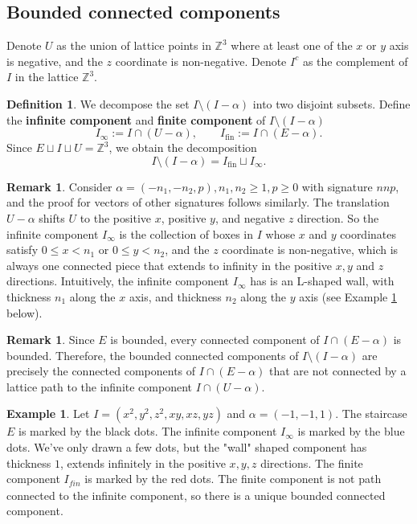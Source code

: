 \documentclass{amsart}[10pt]
\theoremstyle{plain}
\theoremstyle{definition}
\newtheorem{example}[theorem]{Example}
\newtheorem{remark}[theorem]{Remark}
\newtheorem{definition}[theorem]{Definition}
\begin{document}
\subsection{Bounded connected components}

Denote $U$ as the union of lattice points in $\mathbb{Z}^3$ where at least one of the $x$ or $y$ axis is negative, and the $z$ coordinate is non-negative. Denote $I^c$ as the complement of $I$ in the lattice $\mathbb{Z}^3$.

\begin{definition}
We decompose the set $I \setminus (I-\alpha)$ into two disjoint subsets. Define the \textbf{infinite component} and \textbf{finite component} of $I \setminus (I - \alpha)$
$$
I_{\infty}:=I\cap(U-\alpha),\qquad
I_{\mathrm{fin}}:=I\cap(E-\alpha).
$$
Since $E \sqcup I \sqcup U=\mathbb{Z}^3$, we obtain the decomposition
$$
I\setminus(I-\alpha)=I_{\mathrm{fin}}\sqcup I_{\infty}.
$$
\end{definition}


\begin{remark}
Consider $\alpha=(-n_1, -n_2, p), n_1, n_2 \geq 1, p \geq 0$ with signature $nnp$, and the proof for vectors of other signatures follows similarly. The translation $U-\alpha$ shifts $U$ to the positive $x$, positive $y$, and negative $z$ direction. So the infinite component $I_\infty$ is the collection of boxes in $I$ whose $x$ and $y$ coordinates satisfy $0 \leq x < n_1$ or $0 \leq y < n_2$, and the $z$ coordinate is non-negative, which is always one connected piece that extends to infinity in the positive $x,y$ and $z$ directions. Intuitively, the infinite component $I_\infty$ has is an L-shaped wall, with thickness $n_1$ along the $x$ axis, and thickness $n_2$ along the $y$ axis (see Example \ref{example_wall} below). 
\end{remark}

\begin{remark}
\label{rmkpathconnect}
Since $E$ is bounded, every connected component of $I\cap(E-\alpha)$ is bounded. Therefore, the bounded connected components of $I\setminus(I-\alpha)$ are precisely the connected components of $I\cap(E-\alpha)$ that are not connected by a lattice path to the infinite component $I\cap(U-\alpha)$.
\end{remark}

\begin{example}
\label{example_wall}
Let $I=(x^2, y^2, z^2, xy, xz, yz)$ and $\alpha=(-1,-1,1)$. The staircase $E$ is marked by the black dots. The infinite component $I_\infty$ is marked by the \textcolor{teal!90!black}{blue} dots. We've only drawn a few dots, but the "wall" shaped component has thickness $1$, extends infinitely in the positive $x, y, z$ directions. The finite component $I_{\textit{fin}}$ is marked by the \textcolor{red!70!black}{red} dots. The finite component is not path connected to the infinite component, so there is a unique bounded connected component.
\end{example}
\end{document}
